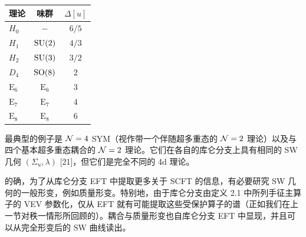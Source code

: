 
\begin{center}
\begin{tabular}{lcc}
\toprule
理论 & 味群 & $\Delta[u]$ \\
\midrule
$H_0$ & $-$ & $6/5$ \\
$H_1$ & $\mathrm{SU}(2)$ & $4/3$ \\
$H_2$ & $\mathrm{SU}(3)$ & $3/2$ \\
$D_4$ & $\mathrm{SO}(8)$ & $2$ \\
$\mathrm{E}_6$ & $\mathrm{E}_6$ & $3$ \\
$\mathrm{E}_7$ & $\mathrm{E}_7$ & $4$ \\
$\mathrm{E}_8$ & $\mathrm{E}_8$ & $6$ \\
\bottomrule
\end{tabular}
\end{center}


最典型的例子是 $\mathcal{N}=4$ SYM（视作带一个伴随超多重态的 $\mathcal{N}=2$ 理论）以及与四个基本超多重态耦合的 $\mathcal{N}=2$ 理论。它们在各自的库仑分支上具有相同的 SW 几何 $(\Sigma_u,\lambda)$ [21]，但它们是完全不同的 4d 理论。


的确，为了从库仑分支 EFT 中提取更多关于 SCFT 的信息，有必要研究 SW 几何的一般形变，例如质量形变。特别地，由于库仑分支由定义 2.1 中所列手征主算子的 VEV 参数化，仅从 EFT 就有可能提取这些受保护算子的谱（正如我们在上一节对秩一情形所回顾的）。耦合与质量形变也自库仑分支 EFT 中显现，并且可以从完全形变后的 SW 曲线读出。


